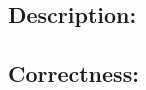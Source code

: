 \documentclass[12pt]{article}
\begin{document}
\subsection*{Description:}

\subsection*{Correctness:}






\end{document}
